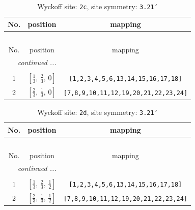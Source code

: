 \documentclass[fleqn,8pt]{jsarticle}
\begin{document}
\begin{longtable}{ccc}
\caption{Wyckoff site: {\tt 2c}, site symmetry: {\tt 3.21'}}
 \\
 \hline \hline
No. & position & mapping \\ \hline \endfirsthead

\multicolumn{2}{l}{\tablename\ \thetable{}} \\
 \hline \hline
No. & position & mapping \\ \hline \endhead

 \hline \hline
\multicolumn{2}{r}{\footnotesize\it continued ...} \\ \endfoot

 \hline \hline
\multicolumn{2}{r}{} \\ \endlastfoot

1 & $\left[ \frac{1}{3},\, \frac{2}{3},\, 0 \right]$ & {\tt [1,2,3,4,5,6,13,14,15,16,17,18]} \\ \hline
2 & $\left[ \frac{2}{3},\, \frac{1}{3},\, 0 \right]$ & {\tt [7,8,9,10,11,12,19,20,21,22,23,24]} \\
\end{longtable}
\renewcommand{\arraystretch}{1.2}
\begin{longtable}{ccc}
\caption{Wyckoff site: {\tt 2d}, site symmetry: {\tt 3.21'}}
 \\
 \hline \hline
No. & position & mapping \\ \hline \endfirsthead

\multicolumn{2}{l}{\tablename\ \thetable{}} \\
 \hline \hline
No. & position & mapping \\ \hline \endhead

 \hline \hline
\multicolumn{2}{r}{\footnotesize\it continued ...} \\ \endfoot

 \hline \hline
\multicolumn{2}{r}{} \\ \endlastfoot

1 & $\left[ \frac{1}{3},\, \frac{2}{3},\, \frac{1}{2} \right]$ & {\tt [1,2,3,4,5,6,13,14,15,16,17,18]} \\ \hline
2 & $\left[ \frac{2}{3},\, \frac{1}{3},\, \frac{1}{2} \right]$ & {\tt [7,8,9,10,11,12,19,20,21,22,23,24]} \\
\end{longtable}
\renewcommand{\arraystretch}{1.2}
\end{document}
